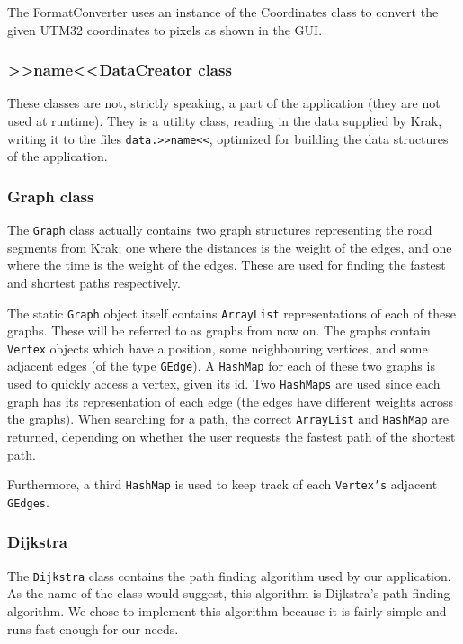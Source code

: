The FormatConverter uses an instance of the Coordinates class to convert the given UTM32 coordinates to pixels as shown in the GUI.

\subsubsection{>>name<<DataCreator class}
These classes are not, strictly speaking, a part of the application (they are not used at runtime). They is a utility class, reading in the data supplied by Krak, writing it to the files \texttt{data.>>name<<}, optimized for building the data structures of the application.

\subsubsection{Graph class}
The \texttt{Graph} class actually contains two graph structures representing the road segments from Krak; one where the distances is the weight of the edges, and one where the time is the weight of the edges. These are used for finding the fastest and shortest paths respectively.
	
The static \texttt{Graph} object itself contains \texttt{ArrayList} representations of each of these graphs. These will be referred to as graphs from now on. The graphs contain \texttt{Vertex} objects which have a position, some neighbouring vertices, and some adjacent edges (of the type \texttt{GEdge}). A \texttt{HashMap} for each of these two graphs is used to quickly access a vertex, given its id. Two \texttt{HashMaps} are used since each graph has its representation of each edge (the edges have different weights across the graphs). When searching for a path, the correct \texttt{ArrayList} and \texttt{HashMap} are returned, depending on whether the user requests the fastest path of the shortest path.

Furthermore, a third \texttt{HashMap} is used to keep track of each \texttt{Vertex's} adjacent \texttt{GEdges}.

\subsubsection{Dijkstra}
The \texttt{Dijkstra} class contains the path finding algorithm used by our application. As the name of the class would suggest, this algorithm is Dijkstra's path finding algorithm. We chose to implement this algorithm because it is fairly simple and runs fast enough for our needs.